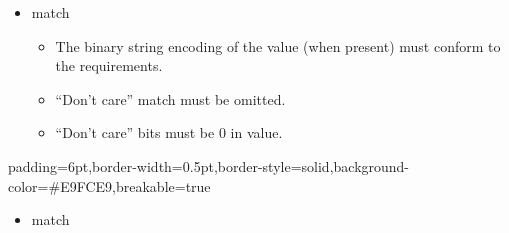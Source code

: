 \documentclass[11pt]{article}
\begin{document}
{\begin{itemize}[noitemsep,topsep=\mdcompacttopsep]
\item{} match

\begin{itemize}[noitemsep,topsep=\mdcompacttopsep]%

\item{}The binary string encoding of the value (when present) must conform to the
 requirements.%

\item{}\textquotedblleft{}Don't care\textquotedblright{} match must be omitted.%

\item{}\textquotedblleft{}Don't care\textquotedblright{} bits must be 0 in value.%
\end{itemize}%
\end{itemize}%

\begin{mdbmargintb}{6pt}{6pt}%
\begin{mdblock}{padding=6pt,border-width=0.5pt,border-style=solid,background-color=\#E9FCE9,breakable=true}%
\begin{mdpre}%
\end{mdpre}%
\end{mdblock}%
\end{mdbmargintb}%

\begin{itemize}[noitemsep,topsep=\mdcompacttopsep]%

\item{} match


\end{itemize}}
\end{document}
